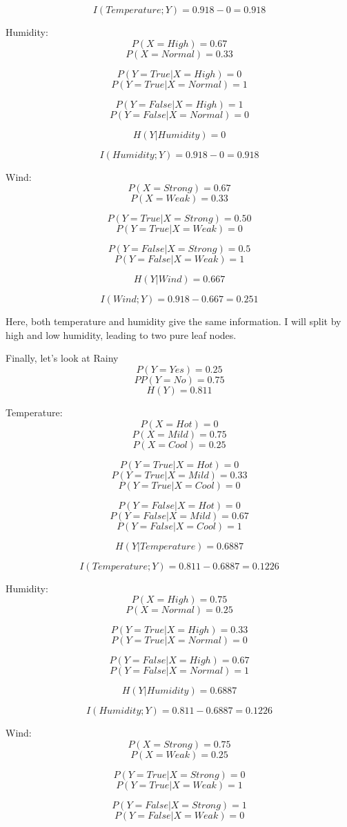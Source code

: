 \documentclass{article}
\begin{document}
\[I(Temperature;Y) = 0.918 - 0 = 0.918\]

Humidity:
\[P(X = High) =  0.67\]
\[P(X = Normal) = 0.33 \]

\[P(Y= True | X = High) = 0 \]
\[P(Y= True | X = Normal) = 1 \]

\[P(Y = False | X = High) = 1 \]
\[P(Y = False | X = Normal) = 0\]

\[H(Y|Humidity) = 0\]

\[I(Humidity;Y) = 0.918 - 0 = 0.918\]

Wind:
\[P(X = Strong) =  0.67\]
\[P(X = Weak) = 0.33 \]

\[P(Y= True | X = Strong) = 0.50 \]
\[P(Y= True | X = Weak) = 0 \]

\[P(Y = False | X = Strong) = 0.5 \]
\[P(Y = False | X = Weak) = 1\]

\[H(Y|Wind) = 0.667\]

\[I(Wind;Y) = 0.918 - 0.667 = 0.251\]

Here, both temperature and humidity give the same information. I will split by high and low humidity, leading to two pure leaf nodes.

Finally, let's look at Rainy
\[P(Y = Yes) = 0.25\]
\[PP(Y = No) = 0.75\]
\[H(Y) = 0.811\]

Temperature:
\[P(X = Hot) =  0\]
\[P(X = Mild) = 0.75 \]
\[P(X = Cool) = 0.25\]

\[P(Y= True | X = Hot) = 0 \]
\[P(Y= True | X = Mild) = 0.33 \]
\[P(Y= True | X = Cool) = 0 \]

\[P(Y = False | X = Hot) = 0 \]
\[P(Y = False | X = Mild) = 0.67\]
\[P(Y = False | X = Cool) = 1\]

\[H(Y|Temperature) = 0.6887\]

\[I(Temperature;Y) = 0.811 - 0.6887 = 0.1226\]

Humidity:
\[P(X = High) =  0.75\]
\[P(X = Normal) = 0.25 \]

\[P(Y= True | X = High) = 0.33 \]
\[P(Y= True | X = Normal) = 0 \]

\[P(Y = False | X = High) = 0.67 \]
\[P(Y = False | X = Normal) = 1\]

\[H(Y|Humidity) = 0.6887\]

\[I(Humidity;Y) = 0.811 - 0.6887 = 0.1226\]

Wind:
\[P(X = Strong) =  0.75\]
\[P(X = Weak) = 0.25 \]

\[P(Y= True | X = Strong) = 0 \]
\[P(Y= True | X = Weak) = 1 \]

\[P(Y = False | X = Strong) = 1 \]
\[P(Y = False | X = Weak) = 0\]
\end{document}
